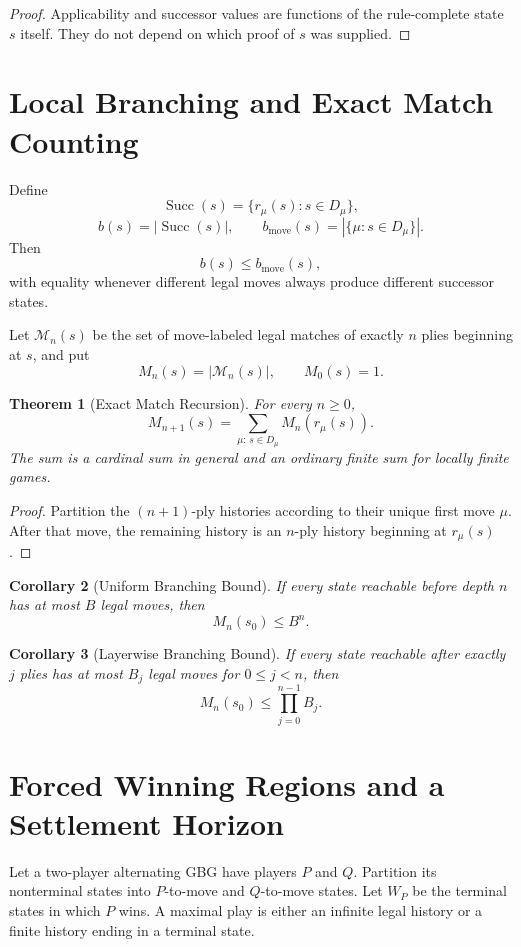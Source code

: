\documentclass[11pt]{article}
\newtheorem{theorem}{Theorem}[section]
\newtheorem{corollary}[theorem]{Corollary}
\theoremstyle{definition}
\theoremstyle{remark}
\newcommand{\Succ}{\operatorname{Succ}}
\begin{document}
\begin{proof}
Applicability and successor values are functions of the rule-complete state $s$ itself. They do not depend on which proof of $s$ was supplied.
\end{proof}

\section{Local Branching and Exact Match Counting}

Define
\[
\Succ(s)=\{r_\mu(s):s\in D_\mu\},
\]
\[
b(s)=|\Succ(s)|,
\qquad
b_{\mathrm{move}}(s)=|\{\mu:s\in D_\mu\}|.
\]
Then
\[
b(s)\le b_{\mathrm{move}}(s),
\]
with equality whenever different legal moves always produce different successor states.

Let $\mathcal M_n(s)$ be the set of move-labeled legal matches of exactly $n$ plies beginning at $s$, and put
\[
M_n(s)=|\mathcal M_n(s)|,
\qquad M_0(s)=1.
\]

\begin{theorem}[Exact Match Recursion]
For every $n\ge0$,
\[
\boxed{
M_{n+1}(s)=\sum_{\mu:\,s\in D_\mu}M_n(r_\mu(s)).
}
\]
The sum is a cardinal sum in general and an ordinary finite sum for locally finite games.
\end{theorem}

\begin{proof}
Partition the $(n+1)$-ply histories according to their unique first move $\mu$. After that move, the remaining history is an $n$-ply history beginning at $r_\mu(s)$.
\end{proof}

\begin{corollary}[Uniform Branching Bound]
If every state reachable before depth $n$ has at most $B$ legal moves, then
\[
\boxed{M_n(s_0)\le B^n.}
\]
\end{corollary}

\begin{corollary}[Layerwise Branching Bound]
If every state reachable after exactly $j$ plies has at most $B_j$ legal moves for $0\le j<n$, then
\[
\boxed{M_n(s_0)\le\prod_{j=0}^{n-1}B_j.}
\]
\end{corollary}

\section{Forced Winning Regions and a Settlement Horizon}

Let a two-player alternating GBG have players $P$ and $Q$. Partition its nonterminal states into $P$-to-move and $Q$-to-move states. Let $W_P$ be the terminal states in which $P$ wins. A maximal play is either an infinite legal history or a finite history ending in a terminal state.
\end{document}
